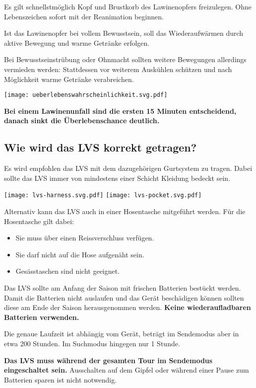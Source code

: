 Es gilt schnellstmöglich Kopf und Brustkorb des Lawinenopfers freizulegen.
Ohne Lebenszeichen sofort mit der Reanimation beginnen.

Ist das Lawinenopfer bei vollem Bewusstsein, soll das Wiederaufwärmen durch aktive Bewegung und warme Getränke erfolgen.

\newcolumn

Bei Bewusstseinstrübung oder Ohnmacht sollten weitere Bewegungen allerdings vermieden werden: Stattdessen vor weiterem Auskühlen schützen und nach Möglichkeit warme Getränke verabreichen.

\begin{center}
  \texttt{[image: ueberlebenswahrscheinlichkeit.svg.pdf]}
\end{center}

\textbf{Bei einem Lawinenunfall sind die ersten 15 Minuten entscheidend, danach sinkt die Überlebenschance deutlich.}

\newcolumn

\subsection{Wie wird das LVS korrekt getragen?}

Es wird empfohlen das LVS mit dem dazugehörigen Gurtsystem zu tragen.
Dabei sollte das LVS immer von mindestens einer Schicht Kleidung bedeckt sein.

\begin{center}
  \texttt{[image: lvs-harness.svg.pdf]}
  \texttt{[image: lvs-pocket.svg.pdf]}
\end{center}

Alternativ kann das LVS auch in einer Hosentasche mitgeführt werden.
Für die Hosentasche gilt dabei:

\begin{itemize}
  \item{Sie muss über einen Reissverschluss verfügen.}
  \item{Sie darf nicht auf die Hose aufgenäht sein.}
  \item{Gesässtaschen sind nicht geeignet.}
\end{itemize}

Das LVS sollte am Anfang der Saison mit frischen Batterien bestückt werden.
Damit die Batterien nicht auslaufen und das Gerät beschädigen können sollten diese am Ende der Saison herausgenommen werden.
\textbf{Keine wiederaufladbaren Batterien verwenden.}

Die genaue Laufzeit ist abhängig vom Gerät, beträgt im Sendemodus aber in etwa 200 Stunden.
Im Suchmodus hingegen nur 1 Stunde.

\textbf{Das LVS muss während der gesamten Tour im Sendemodus eingeschaltet sein.}
Ausschalten auf dem Gipfel oder während einer Pause zum Batterien sparen ist nicht notwendig.

\newcolumn
